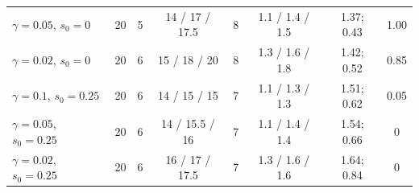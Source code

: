 \begin{table}[t]
{\begin{tabular}{@{}lccccccc@{}}
    $\gamma=0.05$, $s_0=0$ & 20 & 5 & 14 / 17 / 17.5 & 8 & 1.1 / 1.4 / 1.5 & 1.37; 0.43 & 1.00 \\
    $\gamma=0.02$, $s_0=0$ & 20 & 6 & 15 / 18 / 20 & 8 & 1.3 / 1.6 / 1.8 & 1.42; 0.52 & 0.85 \\
    $\gamma=0.1$, $s_0=0.25$ & 20 & 6 & 14 / 15 / 15 & 7 & 1.1 / 1.3 / 1.3 & 1.51; 0.62 & 0.05 \\
    $\gamma=0.05$, $s_0=0.25$ & 20 & 6 & 14 / 15.5 / 16 & 7 & 1.1 / 1.4 / 1.4 & 1.54; 0.66 & 0 \\
    $\gamma=0.02$, $s_0=0.25$ & 20 & 6 & 16 / 17 / 17.5 & 7 & 1.3 / 1.6 / 1.6 & 1.64; 0.84 & 0 \\
    \bottomrule
  \end{tabular}}
\end{table}

\begin{table}[t]
  \centering
  \caption{Generational structure (medians over runs; $n$ runs). Share of births of F1, F2 and later generations;
  mean generation of the births $\langle g\rangle_B$; net reproductive number of the founders and of F1;
  $t_{1/2}$: first week with mean $s<0.5$ over the adults ($a\ge a_{\min}$) and over the animals past the window
  ($a\ge a_w$; Table~\ref{tab:calib-gamma}); plateau: weeks with $N\ge0.98N_{\rm pk}$. Upper block: the reference
  ensemble ($t_{1/2}$ for $a\ge a_w$ from 30 replicates for \textsf{C1}$'$, \textsf{C0} and $\alpha=0$).
  Lower block: the first 20 replicates of each production arm of Section~\ref{sec:res-robustness} (30 for the
  long-lived null model), re-run with the same seeds and a register of generations; their O17p over $n=200$ is in
  that section.}
  \label{tab:calib-gen-variants}
  \small
\end{table}
